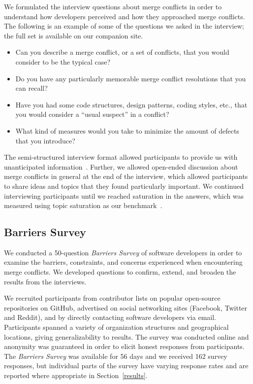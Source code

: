 We formulated the interview questions about merge conflicts in order to understand how developers perceived and how they approached merge conflicts.
The following is an example of some of the questions we asked in the interview; the full set is available on our companion site.
\begin{itemize}
	\item Can you describe a merge conflict, or a set of conflicts, that you would consider to be the typical case?
	\item Do you have any particularly memorable merge conflict resolutions that you can recall?
	\item Have you had some code structures, design patterns, coding styles, etc., that you would consider a ``usual suspect'' in a conflict?
	\item What kind of measures would you take to minimize the amount of defects that you introduce?
\end{itemize}

The semi-structured interview format allowed participants to provide us with unanticipated information~\cite{seaman2008qualitative}. 
Further, we allowed open-ended discussion about merge conflicts in general at the end of the interview, which allowed participants to share ideas and topics that they found particularly important. 
We continued interviewing participants until we reached saturation in the answers, which was measured using topic saturation as our benchmark~\cite{fusch2015we}.

\subsection{Barriers Survey}\label{perceptions_survey}

We conducted a 50-question \textit{Barriers Survey} of software developers in order to examine the barriers, constraints, and concerns experienced when encountering merge conflicts.
We developed questions to confirm, extend, and broaden the results from the interviews.

We recruited participants from contributor lists on popular open-source repositories on GitHub, advertised on social networking sites (Facebook, Twitter and Reddit), and by directly contacting software developers via email. 
Participants spanned a variety of organization structures and geographical locations, giving generalizability to results.
The survey was conducted online and anonymity was guaranteed in order to elicit honest responses from participants.
The \textit{Barriers Survey} was available for 56 days and we received 162 survey responses, but individual parts of the survey have varying response rates and are reported where appropriate in Section~\ref{results}.

